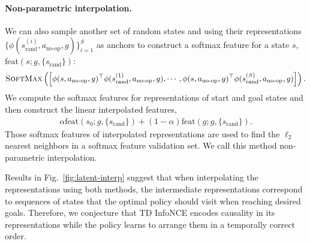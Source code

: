 \documentclass{article} %
\begin{document}
\paragraph{Non-parametric interpolation.} We can also sample another set of random states and using their representations $\{ \phi(s_{\text{rand}}^{(i)}, a_{\text{no-op}}, g) \}_{i = 1}^S$ as anchors to construct a softmax feature for a state $s$, $\text{feat}(s; g, \{s_{\text{rand}}\})$:
\begin{align*}
    \textsc{SoftMax} \left( \left[ \phi(s, a_{\text{no-op}}, g)^{\top} \phi(s_{\text{rand}}^{(1)}, a_{\text{no-op}}, g), \cdots, \phi(s, a_{\text{no-op}}, g)^{\top} \phi(s_{\text{rand}}^{(S)}, a_{\text{no-op}}, g) \right] \right).
\end{align*}
We compute the softmax features for representations of start and goal states and then construct the linear interpolated features,
\begin{align*}
    \alpha \text{feat}(s_0; g, \{s_{\text{rand}}\}) + (1 - \alpha) \text{feat}(g; g, \{s_{\text{rand}}\}).
\end{align*}
Those softmax features of interpolated representations are used to find the $\ell_2$ nearest neighbors in a softmax feature validation set. We call this method non-parametric interpolation. 

Results in Fig.~\ref{fig:latent-interp} suggest that when interpolating the representations using both methods, the intermediate representations correspond to sequences of states that the optimal policy should visit when reaching desired goals. Therefore, we conjecture that TD InfoNCE encodes causality in its representations while the policy learns to arrange them in a temporally correct order.
\end{document}
